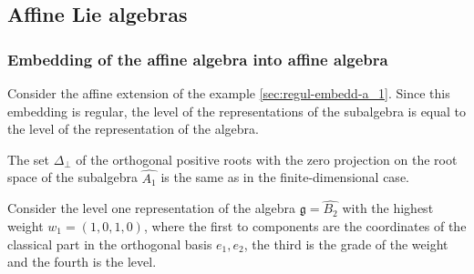 \documentclass[a4paper,12pt]{article}
\theoremstyle{definition} \newtheorem{Def}{Definition}
\begin{document}
\subsection{Affine Lie algebras}
\label{sec:affine-lie-algebras}
\subsubsection{Embedding of the affine algebra into affine algebra}
\label{sec:embedd-affine-algebr}

Consider the affine extension of the example \ref{sec:regul-embedd-a_1}. 
Since this embedding is regular, the level of the representations of the subalgebra is equal to the level of the representation of the algebra. 

The set $\Delta_{\bot}$ of the orthogonal positive roots with the zero projection on the root space of the subalgebra $\hat{A_1}$ is the same as in the finite-dimensional case.

Consider the level one representation of the algebra $\mathfrak{g}=\hat{B_2}$ with the highest weight $w_1=(1,0,1,0)$, where the first to components are the coordinates of the classical part in the orthogonal basis $e_1,e_2$, the third is the grade of the weight and the fourth is the level.
\end{document}
